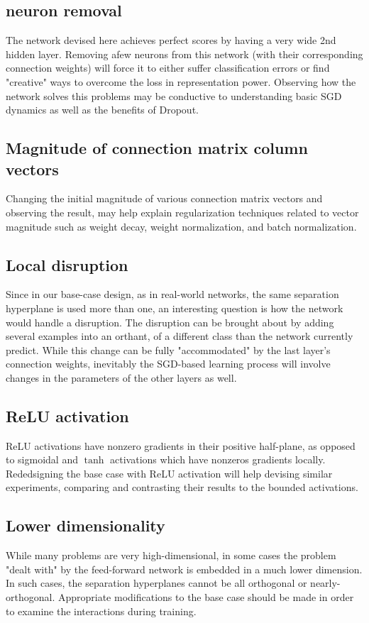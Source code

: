 \documentclass[]{article}
\begin{document}
	\subsection{neuron removal}
		The network devised here achieves perfect scores by having a very wide 2nd hidden layer. Removing afew neurons from this network (with their corresponding connection weights) will force it to either suffer classification errors or find "creative" ways to overcome the loss in representation power. Observing how the network solves this problems may be conductive to understanding basic SGD dynamics as well as the benefits of Dropout.
	\subsection{Magnitude of connection matrix column vectors}
		Changing the initial magnitude of various connection matrix vectors and observing the result, may help explain regularization techniques related to vector magnitude such as weight decay, weight normalization, and batch normalization.
	\subsection{Local disruption}
		Since in our base-case design, as in real-world networks, the same separation hyperplane is used more than one, an interesting question is how the network would handle a disruption. The disruption can be brought about by adding several examples into an orthant, of a different class than the network currently predict. While this change can be fully "accommodated" by the last layer's connection weights, inevitably the SGD-based learning process will involve changes in the parameters of the other layers as well.
	\subsection{ReLU activation}
		ReLU activations have nonzero gradients in their positive half-plane, as opposed to sigmoidal and $\tanh$ activations which have nonzeros gradients locally. Rededsigning the base case with ReLU activation will help devising similar experiments, comparing and contrasting their results to the bounded activations.
	\subsection{Lower dimensionality}
		While many problems are very high-dimensional, in some cases the problem "dealt with" by the feed-forward network is embedded in a much lower dimension. In such cases, the separation hyperplanes	cannot be all orthogonal or nearly-orthogonal. Appropriate modifications to the base case should be made in order to examine the interactions during training.
 
\end{document}
